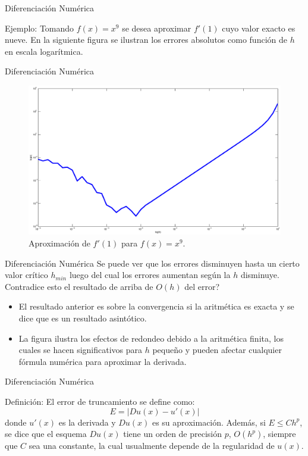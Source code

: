 \documentclass[12pt]{beamer}
\begin{document}
\begin{frame}{Diferenciaci\'on Num\'erica}
  \begin{block}{Ejemplo:}
    Tomando $f(x)=x^9$ se desea aproximar $f'(1)$ cuyo valor exacto es nueve. En la siguiente figura se ilustran los errores absolutos como funci\'on de $h$ en escala logar\'itmica. 
    \end{block}
\end{frame}
\begin{frame}{Diferenciaci\'on Num\'erica}
  \begin{center}
    \begin{figure}
      \includegraphics[scale=0.25]{ejem1.eps}
      \caption{Aproximaci\'on de $f'(1)$ para $f(x)=x^9$.}
    \end{figure}
  \end{center}
\end{frame}
\begin{frame}{Diferenciaci\'on Num\'erica}
  Se puede ver que los errores disminuyen hasta un cierto valor cr\'itico $h_{min}$ luego del cual los errores aumentan seg\'un la $h$ disminuye. \textquestiondown Contradice esto el resultado de arriba de $O(h)$ del error?
  \begin{itemize}
    \item<2-> El resultado anterior es sobre la convergencia si la aritm\'etica es exacta y se dice que es un resultado asint\'otico.
    \item<3-> La figura ilustra los efectos de redondeo debido a la aritm\'etica finita, los cuales se hacen significativos para $h$ peque\~no y pueden afectar cualquier f\'ormula num\'erica para aproximar la derivada.
  \end{itemize}
\end{frame}
\begin{frame}{Diferenciaci\'on Num\'erica}
  \begin{block}{Definici\'on:}
    El error de truncamiento se define como:
    $$
    E = |Du(x) - u'(x)|
    $$
    donde $u'(x)$ es la derivada y $Du(x)$ es su aproximaci\'on. Adem\'as, si $E \leq Ch^p$, se dice que el esquema $Du(x)$ tiene un orden de precisi\'on $p$, $O(h^p)$, siempre que $C$ sea una constante, la cual usualmente depende
    de la regularidad de $u(x)$.
  \end{block}
\end{frame}
\end{document}
